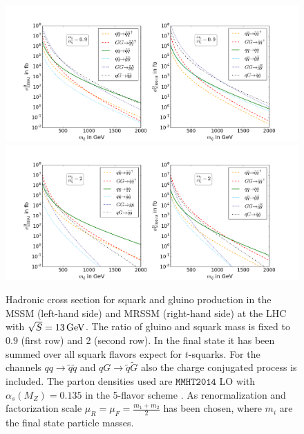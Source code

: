 \begin{figure}[!htpb]
\begin{center}
\includegraphics[scale=.4]{figures/mr=0,9_MSSM+MRSSM}
\includegraphics[scale=.4]{figures/mr=2_MSSM+MRSSM}
\caption{Hadronic cross section for squark and gluino production in the MSSM (left-hand side) and MRSSM (right-hand side) at the LHC with $\sqrt{S} = \unit[13]{GeV}$. The ratio of gluino and squark mass is fixed to 0.9 (first row) and 2 (second row). In the final state it has been summed over all squark flavors expect for $t$-squarks. For the channels $qq \to \tilde{q}\tilde{q}$ and $qG \to \tilde{q}\tilde{G}$ also the charge conjugated process is included. The parton densities used are $\mathtt{MMHT2014}$ LO with $\alpha_s(M_Z) = 0.135$ in the 5-flavor scheme \cite{Harland-Lang:2014zoa}. As renormalization and factorization scale $\mu_R = \mu_F = \frac{m_1 + m_2}{2}$ has been chosen, where $m_i$ are the final state particle masses.} \label{fig:TreeXsection}
\end{center}
\end{figure}

